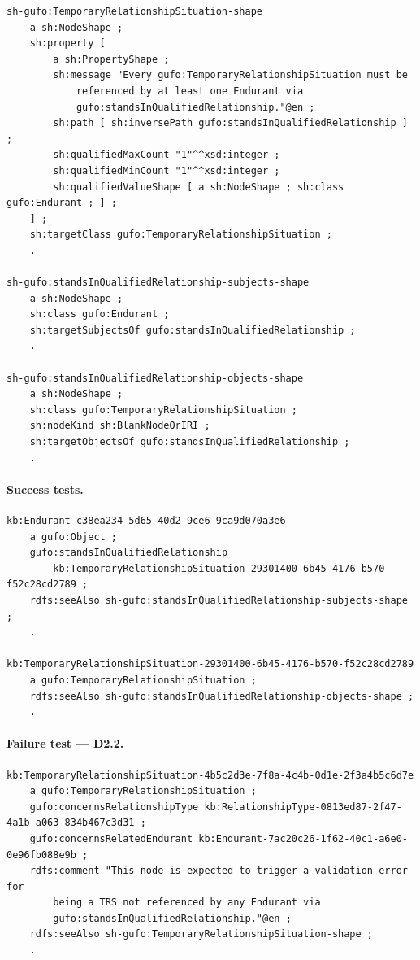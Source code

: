 \documentclass[12pt,a4paper]{article}
\begin{document}
\begin{lstlisting}[style=turtlestyle]
sh-gufo:TemporaryRelationshipSituation-shape
    a sh:NodeShape ;
    sh:property [
        a sh:PropertyShape ;
        sh:message "Every gufo:TemporaryRelationshipSituation must be
            referenced by at least one Endurant via
            gufo:standsInQualifiedRelationship."@en ;
        sh:path [ sh:inversePath gufo:standsInQualifiedRelationship ] ;
        sh:qualifiedMaxCount "1"^^xsd:integer ;
        sh:qualifiedMinCount "1"^^xsd:integer ;
        sh:qualifiedValueShape [ a sh:NodeShape ; sh:class gufo:Endurant ; ] ;
    ] ;
    sh:targetClass gufo:TemporaryRelationshipSituation ;
    .

sh-gufo:standsInQualifiedRelationship-subjects-shape
    a sh:NodeShape ;
    sh:class gufo:Endurant ;
    sh:targetSubjectsOf gufo:standsInQualifiedRelationship ;
    .

sh-gufo:standsInQualifiedRelationship-objects-shape
    a sh:NodeShape ;
    sh:class gufo:TemporaryRelationshipSituation ;
    sh:nodeKind sh:BlankNodeOrIRI ;
    sh:targetObjectsOf gufo:standsInQualifiedRelationship ;
    .
\end{lstlisting}

\paragraph{Success tests.}

\begin{lstlisting}[style=turtlestyle]
kb:Endurant-c38ea234-5d65-40d2-9ce6-9ca9d070a3e6
    a gufo:Object ;
    gufo:standsInQualifiedRelationship
        kb:TemporaryRelationshipSituation-29301400-6b45-4176-b570-f52c28cd2789 ;
    rdfs:seeAlso sh-gufo:standsInQualifiedRelationship-subjects-shape ;
    .

kb:TemporaryRelationshipSituation-29301400-6b45-4176-b570-f52c28cd2789
    a gufo:TemporaryRelationshipSituation ;
    rdfs:seeAlso sh-gufo:standsInQualifiedRelationship-objects-shape ;
    .
\end{lstlisting}

\paragraph{Failure test --- D2.2.}

\begin{lstlisting}[style=turtlestyle]
kb:TemporaryRelationshipSituation-4b5c2d3e-7f8a-4c4b-0d1e-2f3a4b5c6d7e
    a gufo:TemporaryRelationshipSituation ;
    gufo:concernsRelationshipType kb:RelationshipType-0813ed87-2f47-4a1b-a063-834b467c3d31 ;
    gufo:concernsRelatedEndurant kb:Endurant-7ac20c26-1f62-40c1-a6e0-0e96fb088e9b ;
    rdfs:comment "This node is expected to trigger a validation error for
        being a TRS not referenced by any Endurant via
        gufo:standsInQualifiedRelationship."@en ;
    rdfs:seeAlso sh-gufo:TemporaryRelationshipSituation-shape ;
    .
\end{lstlisting}
\end{document}
